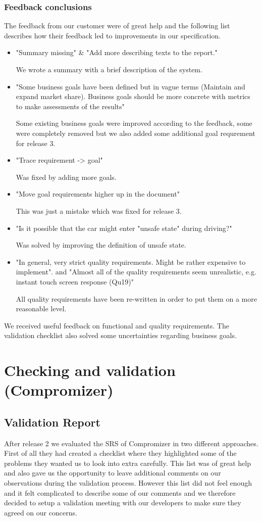 \documentclass[10pt]{article}
\begin{document}
\subsubsection{Feedback conclusions}
The feedback from our customer were of great help and the following list describes how their feedback led to improvements in our specification.
\begin{itemize}
\item "Summary missing" & "Add more describing texts to the report." 

We wrote a summary with a brief description of the system.
\item "Some business goals have been defined but in vague terms (Maintain and expand market share). Business goals should be more concrete with metrics to make assessments of the results"

Some existing business goals were improved according to the feedback, some were completely removed but we also added some additional goal requrement for release 3.
\item "Trace requirement -> goal" 

Was fixed by adding more goals.
\item "Move goal requirements higher up in the document" 

This was just a mistake which was fixed for release 3.
\item "Is it possible that the car might enter "unsafe state" during driving?" 

Was solved by improving the definition of unsafe state.
\item "In general, very strict quality requirements. Might be rather expensive to implement". and "Almost all of the quality requirements seem unrealistic, e.g. instant touch screen response (Qu19)"

All quality requirements have been re-written in order to put them on a more reasonable level.
\end{itemize}

\noindent We received useful feedback on functional and quality requirements. The validation checklist also solved some uncertainties regarding business goals.

\section{Checking and validation (Compromizer)}

\subsection{Validation Report}
After release 2 we evaluated the SRS of Compromizer in two different approaches. First of all they had created a checklist where they highlighted some of the problems they wanted us to look into extra carefully. This list was of great help and also gave us the opportunity to leave additional comments on our observations during the validation process. However this list did not feel enough and it felt complicated to describe some of our comments and we therefore decided to setup a validation meeting with our developers to make sure they agreed on our concerns.
\end{document}
